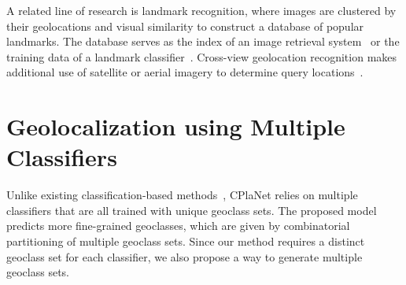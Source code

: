 \documentclass[runningheads]{llncs}
\begin{document}
A related line of research is landmark recognition, where images are clustered by their geolocations and visual similarity to construct a database of popular landmarks.
The database serves as the index of an image retrieval system~\cite{Avrithis10MM,Gammeter09ICCV,Johns11ICCV,Quack08CIVR,Zheng09CVPR,Weyand15CVIU} or the training data of a landmark classifier~\cite{Bergamo13CVPR,Li09CVPR,Gronat13CVPR}.
Cross-view geolocation recognition makes additional use of satellite or aerial imagery to determine query locations~\cite{Workman15ICCV,Lin13CVPR,Lin15CVPR,Tian17CVPR}.
 

\section{Geolocalization using Multiple Classifiers}
\label{sec:comb_part}

Unlike existing classification-based methods~\cite{weyand16planet}, CPlaNet relies on multiple classifiers that are all trained with unique geoclass sets.
The proposed model predicts more fine-grained geoclasses, which are given by combinatorial partitioning of multiple geoclass sets.
Since our method requires a distinct geoclass set for each classifier, we also propose a way to generate multiple geoclass sets.

\iffalse
\subsection{Geolocalization by Classification}
We briefly review the classification based geolocalization methods.
In~\cite{vo17revisiting,weyand16planet}, a classifier is trained to predict the geolocation of an input image.
Since the geolocation is represented in a continuous space, the authors introduce a geoclass set that quantizes the maps of the entire earth by partitioning it into regions.
Note that training images are labeled with the corresponding geoclass based on their GPS tags.
At test time, the center of the geoclass with the highest score is returned as the predicted geolocation of an input image.
This method is computationally cheap in terms of space and time complexity compared to retrieval-based methods, but its quality is highly dependent on how the geoclass set is generated.
Since every image that belongs to the same geoclass has an identical predicted geolocation, more fine-grained partitioning is preferable to obtain precise predictions.
However, it is not always straightforward to increase the number of geoclasses as it linearly increases the number of parameters and makes the network prone to overfitting to training data.
\fi
\end{document}
